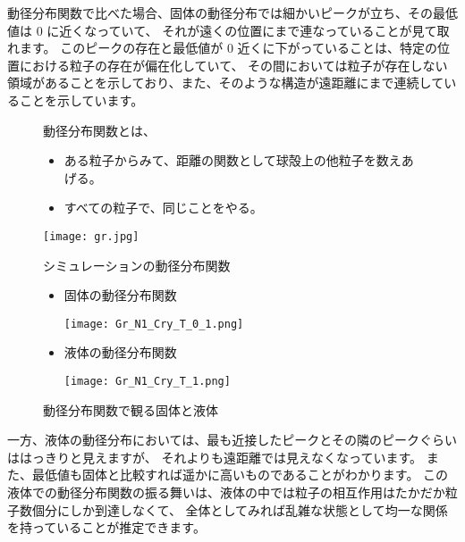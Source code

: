 \documentclass[uplatex,dvipdfmx,a4paper,11pt]{jsarticle}
\begin{document}
動径分布関数で比べた場合、固体の動径分布では細かいピークが立ち、その最低値は 0 に近くなっていて、
それが遠くの位置にまで連なっていることが見て取れます。
このピークの存在と最低値が 0 近くに下がっていることは、特定の位置における粒子の存在が偏在化していて、
その間においては粒子が存在しない領域があることを示しており、また、そのような構造が遠距離にまで連続していることを示しています。
\begin{figure}[htb]
	\begin{center}
		\begin{minipage}{0.4\textwidth}
			\large
			\begin{itembox}[l]{動径分布関数とは、}
				\begin{itemize}
					\item ある粒子からみて、距離の関数として球殻上の他粒子を数えあげる。
					\item すべての粒子で、同じことをやる。
				\end{itemize}
			\end{itembox}
			\begin{center}
				\texttt{[image: gr.jpg]}
				\end{center}
		\end{minipage}
		\begin{minipage}{0.5\textwidth}
			\large
			\begin{itembox}[l]{シミュレーションの動径分布関数}
				\begin{itemize}
					\item 固体の動径分布関数
					
					\texttt{[image: Gr\_N1\_Cry\_T\_0\_1.png]}
					\item 液体の動径分布関数
					
					\texttt{[image: Gr\_N1\_Cry\_T\_1.png]}
				\end{itemize}
			\end{itembox}
		\end{minipage}
		\caption{動径分布関数で観る固体と液体}
		\label{fig:gr}
	\end{center}
\end{figure}

一方、液体の動径分布においては、最も近接したピークとその隣のピークぐらいははっきりと見えますが、
それよりも遠距離では見えなくなっています。
また、最低値も固体と比較すれば遥かに高いものであることがわかります。
この液体での動径分布関数の振る舞いは、液体の中では粒子の相互作用はたかだか粒子数個分にしか到達しなくて、
全体としてみれば乱雑な状態として均一な関係を持っていることが推定できます。
\end{document}
